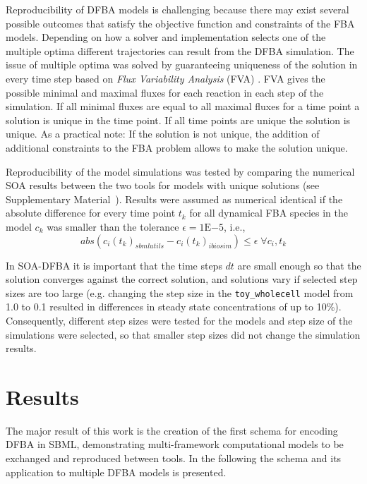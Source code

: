 \documentclass{bioinfo}
\begin{document}
\begin{methods}
Reproducibility of DFBA models is challenging because there may exist several possible outcomes that satisfy the objective function and constraints of the FBA models. Depending on how a solver and implementation selects one of the multiple optima different trajectories can result from the DFBA simulation. The issue of multiple optima was solved by guaranteeing uniqueness of the solution in every time step based on \emph{Flux Variability Analysis} (FVA) \citep{FVA}. FVA gives the possible minimal and maximal fluxes for each reaction in each step of the simulation. If all minimal fluxes are equal to all maximal fluxes for a time point a solution is unique in the time point. If all time points are unique the solution is unique. As a practical note: If the solution is not unique, the addition of additional constraints to the FBA problem allows to make the solution unique.

Reproducibility of the model simulations was tested by comparing the numerical SOA results between the two tools for models with unique solutions (see Supplementary Material~). Results were assumed as numerical identical if the absolute difference for every time point $t_k$ for all dynamical FBA species in the model $c_k$ was smaller than the tolerance $\epsilon = 1\mathrm{E}{-5}$, i.e.,
$$
abs(c_{i}(t_k)_{sbmlutils}-c_{i}(t_k)_{ibiosim}) \leq \epsilon \; \forall c_{i}, t_{k}
$$

In SOA-DFBA it is important that the time steps $dt$ are small enough so that the solution converges against the correct solution, and solutions vary if selected step sizes are too large (e.g. changing the step size in the \texttt{toy\_wholecell} model from 1.0 to 0.1 resulted in differences in steady state concentrations of up to 10\%). Consequently, different step sizes were tested for the models and step size of the simulations were selected, so that smaller step sizes did not change the simulation results.
\end{methods}

\section{Results}
The major result of this work is the creation of the first schema for encoding DFBA in SBML, demonstrating multi-framework computational models to be exchanged and reproduced between tools. In the following the schema and its application to multiple DFBA models is presented.
\end{document}
